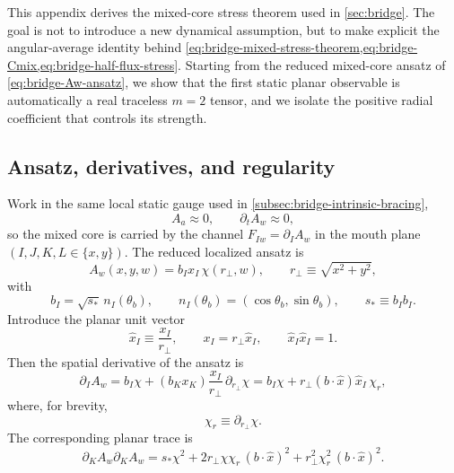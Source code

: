 \documentclass[11pt]{article}
\theoremstyle{plain}
\theoremstyle{definition}
\theoremstyle{remark}
\begin{document}
This appendix derives the mixed-core stress theorem used in \cref{sec:bridge}. The goal is not to introduce a new dynamical assumption, but to make explicit the angular-average identity behind \cref{eq:bridge-mixed-stress-theorem,eq:bridge-Cmix,eq:bridge-half-flux-stress}. Starting from the reduced mixed-core ansatz of \cref{eq:bridge-Aw-ansatz}, we show that the first static planar observable is automatically a real traceless \(m=2\) tensor, and we isolate the positive radial coefficient that controls its strength.

\subsection{Ansatz, derivatives, and regularity}\label{subsec:stress-ansatz}

Work in the same local static gauge used in \cref{subsec:bridge-intrinsic-bracing},
\begin{equation}
A_a\approx 0,
\qquad
\partial_t A_w\approx 0,
\label{eq:stress-static-gauge}
\end{equation}
so the mixed core is carried by the channel \(F_{Iw}=\partial_I A_w\) in the mouth plane \((I,J,K,L\in\{x,y\})\). The reduced localized ansatz is
\begin{equation}
A_w(x,y,w)=b_Ix_I\,\chi(r_\perp,w),
\qquad
r_\perp\equiv\sqrt{x^2+y^2},
\label{eq:stress-Aw-ansatz}
\end{equation}
with
\begin{equation}
b_I=\sqrt{s_*}\,n_I(\theta_b),
\qquad
n_I(\theta_b)=(\cos\theta_b,\sin\theta_b),
\qquad
s_*\equiv b_Ib_I.
\label{eq:stress-bI-def}
\end{equation}
Introduce the planar unit vector
\begin{equation}
\hat x_I\equiv \frac{x_I}{r_\perp},
\qquad
x_I=r_\perp\hat x_I,
\qquad
\hat x_I\hat x_I=1.
\label{eq:stress-xhat-def}
\end{equation}
Then the spatial derivative of the ansatz is
\begin{equation}
\partial_I A_w
=
b_I\chi + (b_Kx_K)\frac{x_I}{r_\perp}\,\partial_{r_\perp}\chi
=
b_I\chi + r_\perp(b\!\cdot\!\hat x)\hat x_I\,\chi_r,
\label{eq:stress-dIw}
\end{equation}
where, for brevity,
\begin{equation}
\chi_r\equiv \partial_{r_\perp}\chi.
\label{eq:stress-chi-r}
\end{equation}
The corresponding planar trace is
\begin{equation}
\partial_KA_w\partial_KA_w
=
s_*\chi^2 + 2r_\perp\chi\chi_r\,(b\!\cdot\!\hat x)^2 + r_\perp^2\chi_r^2\,(b\!\cdot\!\hat x)^2.
\label{eq:stress-trace-pointwise}
\end{equation}
\end{document}
